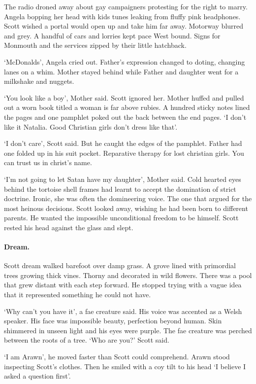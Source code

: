 The radio droned away about gay campaigners protesting for the right
to marry. Angela bopping her head with kids tunes leaking from fluffy
pink headphones. Scott wished a portal would open up and take him far
away. Motorway blurred and grey. A handful of cars and lorries kept
pace West bound. Signs for Monmouth and the services zipped by their
little hatchback.

`McDonalds', Angela cried out. Father's expression changed to
doting, changing lanes on a whim. Mother stayed behind while Father
and daughter went for a milkshake and nuggets.

`You look like a boy', Mother said. Scott ignored her. Mother huffed
and pulled out a worn book titled a woman is far above rubies. A
hundred sticky notes lined the pages and one pamphlet poked out the
back between the end pages. `I don't like it Natalia. Good Christian
girls don't dress like that'.

`I don't care', Scott said. But he caught the edges of the
pamphlet. Father had one folded up in his suit pocket. Reparative
therapy for lost christian girls. You can trust us in christ's name.

`I'm not going to let Satan have my daughter', Mother said. Cold
hearted eyes behind the tortoise shell frames had learnt to accept the
domination of strict doctrine. Ironic, she was often the domineering
voice. The one that argued for the most heinous decisions. Scott
looked away, wishing he had been born to different parents. He wanted
the impossible unconditional freedom to be himself. Scott rested his
head against the glass and slept.

\paragraph{Dream.}

Scott dream walked barefoot over damp grass. A grove lined with
primordial trees growing thick vines. Thorny and decorated in wild
flowers. There was a pool that grew distant with each step forward. He
stopped trying with a vague idea that it represented something he
could not have.

`Why can't you have it', a fae creature said. His voice was accented
as a Welsh speaker. His face was impossible beauty, perfection beyond
human. Skin shimmered in unseen light and his eyes were purple. The
fae creature was perched between the roots of a tree.  `Who are
you?' Scott said.

`I am Arawn', he moved faster than Scott could comprehend. Arawn
stood inspecting Scott's clothes. Then he smiled with a coy tilt to
his head `I believe I asked a question first'.

